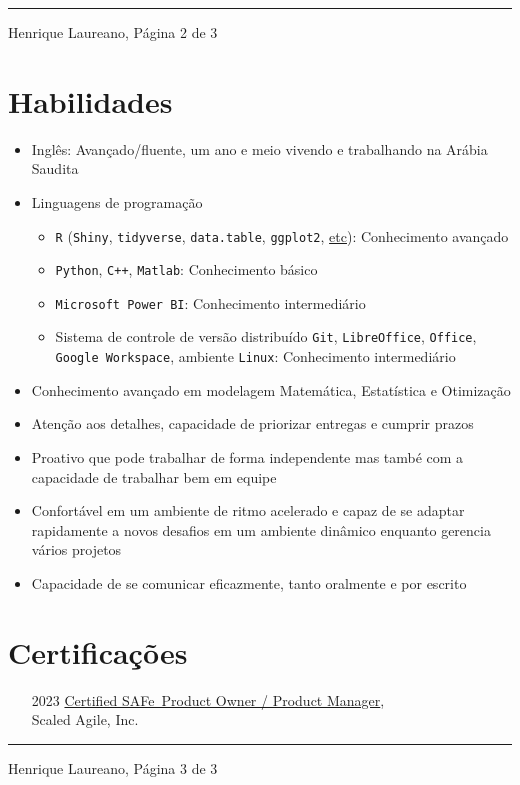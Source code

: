 \documentclass[12pt]{article}
\newcommand{\horrule}[1]{\noindent\rule{\linewidth}{#1}}
\begin{document}
\vspace{\fill}
\horrule{1pt}
\noindent Henrique Laureano, \hfill P\'{a}gina 2 de 3

\section*{Habilidades}

\begin{itemize}
 \item Ingl\^{e}s: Avan\c{c}ado/fluente, um ano e meio vivendo e
       trabalhando na Ar\'{a}bia Saudita
 \item Linguagens de programa\c{c}\~{a}o
  \begin{itemize}
   \item \texttt{R} (\texttt{Shiny}, \texttt{tidyverse},
     \texttt{data.table}, \texttt{ggplot2},
     \href{https://henriquelaureano.github.io/visualizations/}{\color{blue}etc}):
     Conhecimento avan\c{c}ado
   \item \texttt{Python}, \texttt{C++}, \texttt{Matlab}: Conhecimento
          b\'{a}sico
   \item \texttt{Microsoft Power BI}: Conhecimento intermedi\'{a}rio        
   \item Sistema de controle de vers\~{a}o distribu\'{i}do \texttt{Git},
         \texttt{LibreOffice}, \texttt{Office},
         \texttt{Google Workspace}, ambiente \texttt{Linux}:
         Conhecimento intermedi\'{a}rio
  \end{itemize}
 \item Conhecimento avan\c{c}ado em modelagem Matem\'{a}tica,
       Estat\'{i}stica e Otimiza\c{c}\~{a}o
 \item Aten\c{c}\~{a}o aos detalhes, capacidade de priorizar entregas e cumprir
       prazos
 \item Proativo que pode trabalhar de forma independente mas tamb\'{e} com a
       capacidade de trabalhar bem em equipe
 \item Confort\'{a}vel em um ambiente de ritmo acelerado e capaz de se adaptar
       rapidamente a novos desafios em um ambiente din\^{a}mico enquanto gerencia
       v\'{a}rios projetos
 \item Capacidade de se comunicar eficazmente, tanto oralmente e por escrito
\end{itemize}

\section*{Certifica\c{c}\~{o}es}

\begin{itemize}
 \item[2023] \href{https://www.credly.com/badges/14777d32-2f4f-43b9-bbff-4f414779f485/linked_in?t=rxek5i}{\color{blue}Certified SAFe\textregistered~Product Owner / Product Manager},\\
             Scaled Agile, Inc.
\end{itemize}

\vspace{\fill}
\horrule{1pt}
\noindent Henrique Laureano, \hfill P\'{a}gina 3 de 3
\end{document}
